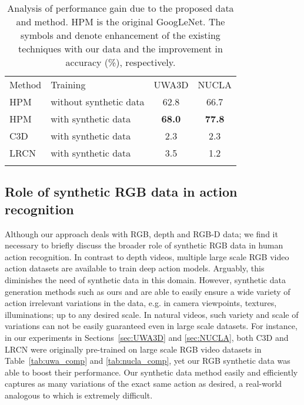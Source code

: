 \documentclass[twocolumn]{svjour3}          \smartqed  \usepackage{graphicx}
\begin{document}
\begin{table}[t]
\centering
\caption{Analysis of performance gain due to the proposed data and method. HPM is the original GoogLeNet. The symbols  and  denote  enhancement of the existing techniques with our  data and the improvement in accuracy (\%), respectively.}
\label{tab:improvement_compare}
\begin{tabular}{llcc}
\hline\noalign{\smallskip}
Method & Training & \multicolumn{1}{l}{UWA3D} & \multicolumn{1}{l}{NUCLA} \\ 

\noalign{\smallskip}\hline\noalign{\smallskip}

HPM & without synthetic data & 62.8 & 66.7 \\ HPM & with synthetic data & \bf{68.0} & \textbf{77.8} \\ 

\noalign{\smallskip}\hline\noalign{\smallskip}



C3D & with synthetic data &2.3 & 2.3\\ 
LRCN & with synthetic data & 3.5 & 1.2\\

\hline\noalign{\smallskip}
\end{tabular}
\end{table}




\subsection{Role of synthetic RGB data in action recognition}
Although our approach deals with RGB, depth and RGB-D data;  we find it necessary to briefly discuss the broader role of synthetic RGB data in human action recognition. In contrast to depth videos, multiple large scale RGB video action datasets are available to train deep action models. Arguably, this diminishes the need of synthetic data in this domain.
However, synthetic data generation methods such as ours and \citep{varol17} are able to easily ensure a wide variety of action irrelevant variations in the data, e.g. in camera viewpoints, textures, illuminations; up to any desired scale.  In natural videos, such variety and scale of variations can not be easily guaranteed even in large scale datasets.  For instance,  in our experiments in Sections~\ref{sec:UWA3D} and \ref{sec:NUCLA}, both C3D and LRCN were originally pre-trained on large scale RGB video datasets in Table~\ref{tab:uwa_comp} and \ref{tab:nucla_comp}, yet our RGB synthetic data was able to boost their  performance.  Our synthetic data method easily and efficiently captures as many variations of  the exact same action as desired, a real-world analogous to which is extremely difficult.
\end{document}
